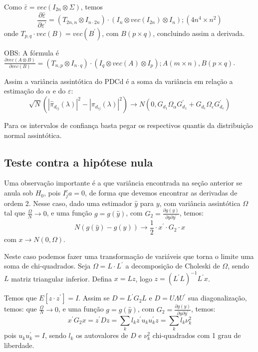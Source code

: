 \documentclass[a4paper,10pt]{article}
\begin{document}
Como $\bar{\varepsilon} = vec(I_{2n} \otimes \Sigma)$, temos
\begin{equation}
\frac{\partial \bar{\varepsilon}}{\partial \varepsilon^{'}} = (T_{2n,n} \otimes I_{n \cdot 2n}) \cdot (I_{n} \otimes vec(I_{2n}) \otimes I_{n}); (4n^{4} \times n^{2})
\end{equation}
onde $T_{p,q} \cdot vec(B) = vec(B^{'})$, com $B (p \times q)$, concluindo assim a derivada.

OBS: A fórmula é $\frac{\partial vec(A \otimes B)}{\partial vec(B)} = (T_{n,p} \otimes I_{n \cdot q}) \cdot (I_{q} \otimes vec(A) \otimes I_{p}); A (m \times n), B (p \times q)$.

Assim a variância assintótica do PDCd é a soma da variância em relação a estimação do $\alpha$ e do $\varepsilon$:
\begin{equation}
\sqrt{N} (|\hat{\pi}_{d_{ij}}(\lambda)|^{2} - |\pi_{d_{ij}}(\lambda)|^{2}) \to N(0, G_{d_1} \Omega_{\alpha} G_{d_1}^{'} + G_{d_e} \Omega_{\varepsilon} G_{d_e}^{'}) 
\end{equation}

Para os intervalos de confiança basta pegar os respectivos quantis da distribuição normal assintótica.

\subsection{Teste contra a hipótese nula}

Uma observação importante é a que variância encontrada na seção anterior se anula sob $H_0$, pois $I_{j}^{c} a = 0$, de forma que devemos encontrar as derivadas de ordem 2. Nesse caso, dado uma estimador $\hat{y}$ para $y$, com variância assintótica $\Omega$ tal que $\frac{\Omega}{N} \to 0$, e uma função $g = g(\hat{y})$, com $G_2 = \frac{\partial g(y)}{\partial y \partial y^{'}}$, temos:
\begin{equation}
N (g(\hat{y}) - g(y)) \to \frac{1}{2} \cdot x^{'} \cdot G_2 \cdot x
\end{equation}
com $x \to N(0, \Omega)$.

Neste caso podemos fazer uma transformação de variáveis que torna o limite uma soma de chi-quadrados. Seja $\Omega = L \cdot L^{'}$ a decomposição de Choleski de $\Omega$, sendo $L$ matriz triangular inferior. Defina $x = Lz$, logo $z = (L^{'}L)^{-1} L^{'} x$.

Temos que $E[z \cdot z^{'}] = I$. Assim se $D = L^{'} G_2 L$ e $D = U \Lambda U^{'}$ sua diagonalização, temos:
que $\frac{\Omega}{N} \to 0$, e uma função $g = g(\hat{y})$, com $G_2 = \frac{\partial g(y)}{\partial y \partial y^{'}}$, temos:
\begin{equation}
x^{'} G_{2} x = z^{'} D z = \sum_{k} {l_{k} z^{'} u_{k} u_{k}^{'} z} = \sum_{k} {l_{k} \nu_{k}^{2}}
\end{equation}
pois $u_{k} u_{k}^{'} = I$, sendo $l_{k}$ os autovalores de $D$ e $\nu_{k}^{2}$ chi-quadrados com 1 grau de liberdade.
\end{document}
